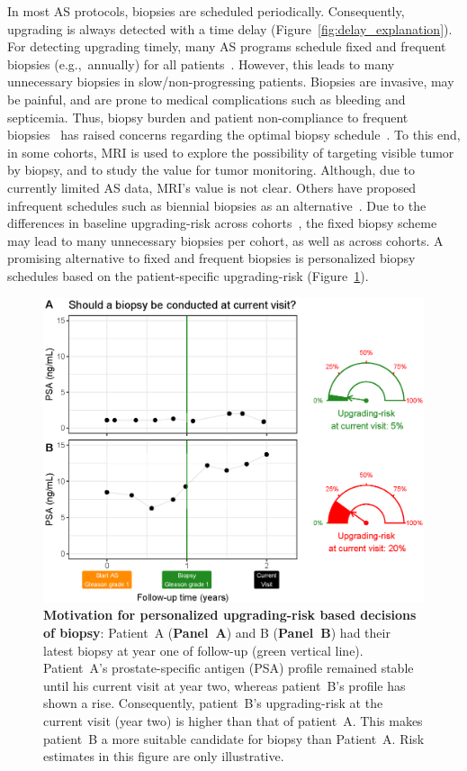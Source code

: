 In most AS protocols, biopsies are scheduled periodically. Consequently, upgrading is always detected with a time delay (Figure~\ref{fig:delay_explanation}). For detecting upgrading timely, many AS programs schedule fixed and frequent biopsies (e.g.,~annually) for all patients~\citep{nieboer2018active,loeb2014heterogeneity}. However, this leads to many unnecessary biopsies in slow/non-progressing patients. Biopsies are invasive, may be painful, and are prone to medical complications such as bleeding and septicemia\citep{loeb2013systematic}. Thus, biopsy burden and patient non-compliance to frequent biopsies~\citep{bokhorst2015compliance} has raised concerns regarding the optimal biopsy schedule~\citep{inoue2018comparative, bratt2013study}. To this end, in some cohorts, MRI is used to explore the possibility of targeting visible tumor by biopsy, and to study the value for tumor monitoring. Although, due to currently limited AS data, MRI's value is not clear. Others have proposed infrequent schedules such as biennial biopsies as an alternative~\citep{inoue2018comparative,de2017estimating}. Due to the differences in baseline upgrading-risk across cohorts~\citep{inoue2018comparative}, the fixed biopsy scheme may lead to many unnecessary biopsies per cohort, as well as across cohorts. A promising alternative to fixed and frequent biopsies is personalized biopsy schedules based on the patient-specific upgrading-risk (Figure~\ref{fig:riskBasedExample}).

\begin{figure}
\centerline{\includegraphics[width=\columnwidth]{images/riskBasedExample.eps}}
\caption{\textbf{Motivation for personalized upgrading-risk based decisions of biopsy}: Patient~A (\textbf{Panel~A}) and B (\textbf{Panel~B}) had their latest biopsy at year one of follow-up (green vertical line). Patient~A's prostate-specific antigen (PSA) profile remained stable until his current visit at year two, whereas patient~B's profile has shown a rise. Consequently, patient~B's upgrading-risk at the current visit (year two) is higher than that of patient~A. This makes patient~B a more suitable candidate for biopsy than Patient~A. Risk estimates in this figure are only illustrative.}
\label{fig:riskBasedExample}
\end{figure}

